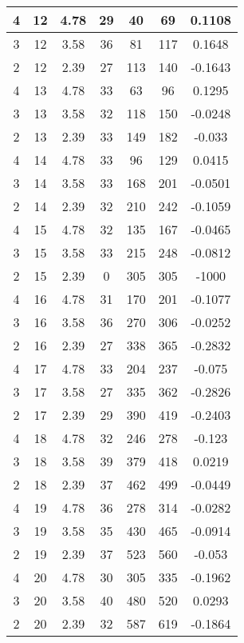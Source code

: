 \documentclass[letterpaper, 12pt]{article}
\begin{document}
\begin{longtable}{|c|c|c|c|c|c|c|}
\hline
4 & 12 & 4.78 & 29 & 40 & 69 & 0.1108 \\
\hline
3 & 12 & 3.58 & 36 & 81 & 117 & 0.1648 \\
\hline
2 & 12 & 2.39 & 27 & 113 & 140 & -0.1643 \\
\hline
4 & 13 & 4.78 & 33 & 63 & 96 & 0.1295 \\
\hline
3 & 13 & 3.58 & 32 & 118 & 150 & -0.0248 \\
\hline
2 & 13 & 2.39 & 33 & 149 & 182 & -0.033 \\
\hline
4 & 14 & 4.78 & 33 & 96 & 129 & 0.0415 \\
\hline
3 & 14 & 3.58 & 33 & 168 & 201 & -0.0501 \\
\hline
2 & 14 & 2.39 & 32 & 210 & 242 & -0.1059 \\
\hline
4 & 15 & 4.78 & 32 & 135 & 167 & -0.0465 \\
\hline
3 & 15 & 3.58 & 33 & 215 & 248 & -0.0812 \\
\hline
2 & 15 & 2.39 & 0 & 305 & 305 & -1000 \\
\hline
4 & 16 & 4.78 & 31 & 170 & 201 & -0.1077 \\
\hline
3 & 16 & 3.58 & 36 & 270 & 306 & -0.0252 \\
\hline
2 & 16 & 2.39 & 27 & 338 & 365 & -0.2832 \\
\hline
4 & 17 & 4.78 & 33 & 204 & 237 & -0.075 \\
\hline
3 & 17 & 3.58 & 27 & 335 & 362 & -0.2826 \\
\hline
2 & 17 & 2.39 & 29 & 390 & 419 & -0.2403 \\
\hline
4 & 18 & 4.78 & 32 & 246 & 278 & -0.123 \\
\hline
3 & 18 & 3.58 & 39 & 379 & 418 & 0.0219 \\
\hline
2 & 18 & 2.39 & 37 & 462 & 499 & -0.0449 \\
\hline
4 & 19 & 4.78 & 36 & 278 & 314 & -0.0282 \\
\hline
3 & 19 & 3.58 & 35 & 430 & 465 & -0.0914 \\
\hline
2 & 19 & 2.39 & 37 & 523 & 560 & -0.053 \\
\hline
4 & 20 & 4.78 & 30 & 305 & 335 & -0.1962 \\
\hline
3 & 20 & 3.58 & 40 & 480 & 520 & 0.0293 \\
\hline
2 & 20 & 2.39 & 32 & 587 & 619 & -0.1864 \\
\hline
\end{longtable}
\end{document}
